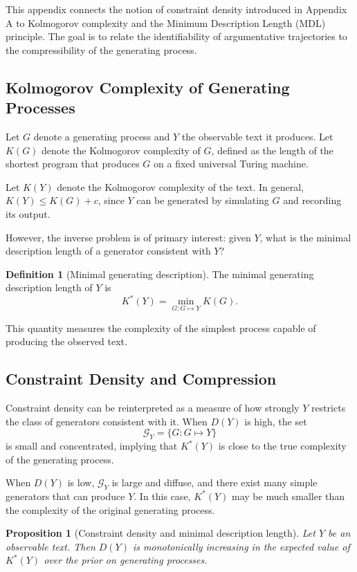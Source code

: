 \documentclass[12pt, oneside]{article}
\theoremstyle{plain}
\newtheorem{proposition}[theorem]{Proposition}
\theoremstyle{definition}
\newtheorem{definition}[theorem]{Definition}
\theoremstyle{remark}
\begin{document}
This appendix connects the notion of constraint density introduced in Appendix A
to Kolmogorov complexity and the Minimum Description Length (MDL) principle. The
goal is to relate the identifiability of argumentative trajectories to the
compressibility of the generating process.

\subsection{Kolmogorov Complexity of Generating Processes}

Let $G$ denote a generating process and $Y$ the observable text it produces. Let
$K(G)$ denote the Kolmogorov complexity of $G$, defined as the length of the shortest
program that produces $G$ on a fixed universal Turing machine.

Let $K(Y)$ denote the Kolmogorov complexity of the text. In general, $K(Y) \leq K(G) + c$,
since $Y$ can be generated by simulating $G$ and recording its output.

However, the inverse problem is of primary interest: given $Y$, what is the minimal
description length of a generator consistent with $Y$?

\begin{definition}[Minimal generating description]
The minimal generating description length of $Y$ is
\[
  K^*(Y) = \min_{G : G \mapsto Y} K(G).
\]
\end{definition}

This quantity measures the complexity of the simplest process capable of producing
the observed text.

\subsection{Constraint Density and Compression}

Constraint density can be reinterpreted as a measure of how strongly $Y$ restricts
the class of generators consistent with it. When $D(Y)$ is high, the set
\[
  \mathcal{G}_Y = \{ G : G \mapsto Y \}
\]
is small and concentrated, implying that $K^*(Y)$ is close to the true complexity
of the generating process.

When $D(Y)$ is low, $\mathcal{G}_Y$ is large and diffuse, and there exist many
simple generators that can produce $Y$. In this case, $K^*(Y)$ may be much smaller
than the complexity of the original generating process.

\begin{proposition}[Constraint density and minimal description length]
Let $Y$ be an observable text. Then $D(Y)$ is monotonically increasing in the
expected value of $K^*(Y)$ over the prior on generating processes.
\end{proposition}
\end{document}
